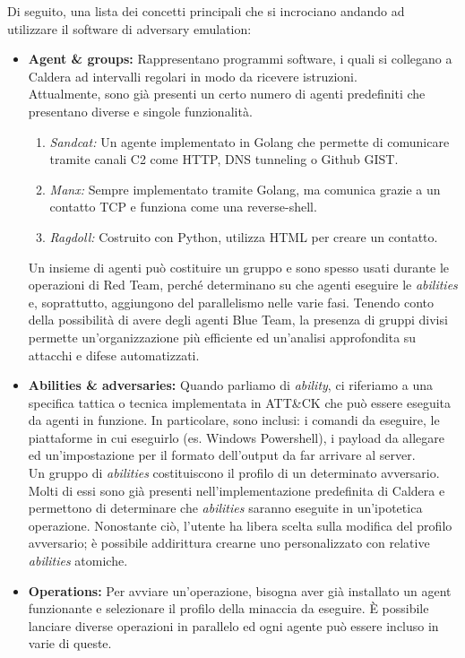     Di seguito, una lista dei concetti principali che si incrociano andando ad utilizzare il software di adversary emulation:
    \begin{itemize}
        \item \textbf{Agent \& groups:} Rappresentano programmi software, i quali si collegano a Caldera ad intervalli regolari in modo da ricevere istruzioni.\\
        Attualmente, sono già presenti un certo numero di agenti predefiniti che presentano diverse e singole funzionalità.
        \begin{enumerate}
            \item \textit{Sandcat:} Un agente implementato in Golang che permette di comunicare tramite canali C2 come HTTP, DNS tunneling o Github GIST.
            \item \textit{Manx:} Sempre implementato tramite Golang, ma comunica grazie a un contatto TCP e funziona come una reverse-shell.
            \item \textit{Ragdoll:} Costruito con Python, utilizza HTML per creare un contatto. 
        \end{enumerate}
        Un insieme di agenti può costituire un gruppo e sono spesso usati durante le operazioni di Red Team, perché determinano su che agenti eseguire le \textit{abilities} e, soprattutto, aggiungono del parallelismo nelle varie fasi. Tenendo conto della possibilità di avere degli agenti Blue Team, la presenza di gruppi divisi permette un'organizzazione più efficiente ed un'analisi approfondita su attacchi e difese automatizzati.
        \item \textbf{Abilities \& adversaries:} Quando parliamo di \textit{ability}, ci riferiamo a una specifica tattica o tecnica implementata in ATT\&CK che può essere eseguita da agenti in funzione. In particolare, sono inclusi: i comandi da eseguire, le piattaforme in cui eseguirlo (es. Windows Powershell), i payload da allegare ed un'impostazione per il formato dell'output da far arrivare al server.\\
        Un gruppo di \textit{abilities} costituiscono il profilo di un determinato avversario. Molti di essi sono già presenti nell'implementazione predefinita di Caldera e permettono di determinare che \textit{abilities} saranno eseguite in un'ipotetica operazione. Nonostante ciò, l'utente ha libera scelta sulla modifica del profilo avversario; è possibile addirittura crearne uno personalizzato con relative \textit{abilities} atomiche.
        \item \textbf{Operations:} Per avviare un'operazione, bisogna aver già installato un agent funzionante e selezionare il profilo della minaccia da eseguire. È possibile lanciare diverse operazioni in parallelo ed ogni agente può essere incluso in varie di queste.\\

\end{itemize}

